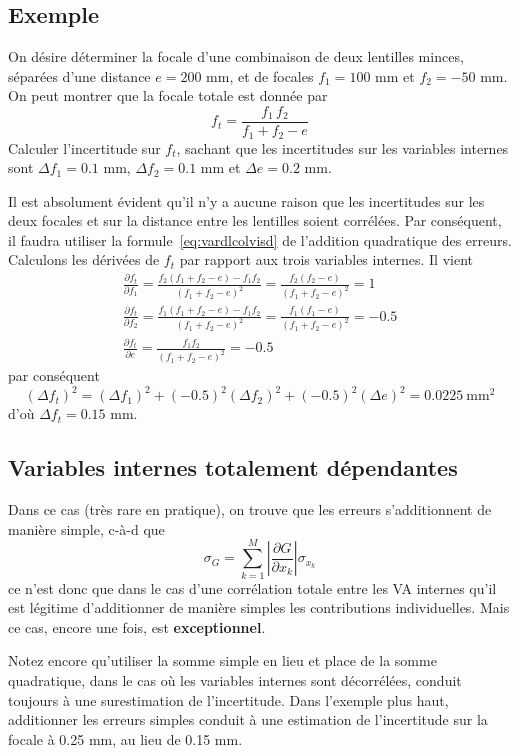 \subsection*{Exemple}\label{sec:exopt}

On désire déterminer la focale d'une combinaison de deux lentilles minces, séparées d'une distance $e=200$ mm, et de focales $f_1=100$ mm et $f_2=-50$ mm. On peut montrer que la focale totale est donnée par
$$
f_t=\frac{f_1\,f_2}{f_1+f_2-e}
$$
Calculer l'incertitude sur $f_t$, sachant que les incertitudes sur les variables internes sont $\Delta f_1=0.1$ mm, $\Delta f_2=0.1$ mm et $\Delta e=0.2$ mm.

Il est absolument évident qu'il n'y a aucune raison que les incertitudes sur les deux focales et sur la distance entre les lentilles soient corrélées. Par conséquent, il faudra utiliser la formule~\ref{eq:vardlcolvisd} de l'addition quadratique des erreurs. Calculons les dérivées de $f_t$ par rapport aux trois variables internes. Il vient
\begin{gather*}
\frac{\partial f_t}{\partial f_1}=\frac{f_2(f_1+f_2-e)-f_1f_2}{(f_1+f_2-e)^2}=
\frac{f_2(f_2-e)}{(f_1+f_2-e)^2}=1\\
\frac{\partial f_t}{\partial f_2}=\frac{f_1(f_1+f_2-e)-f_1f_2}{(f_1+f_2-e)^2}=
\frac{f_1(f_1-e)}{(f_1+f_2-e)^2}=-0.5\\
\frac{\partial f_t}{\partial e}=\frac{f_1f_2}{(f_1+f_2-e)^2}=-0.5
\end{gather*}
par conséquent
$$
(\Delta f_t)^2=(\Delta f_1)^2+(-0.5)^2(\Delta f_2)^2+(-0.5)^2(\Delta e)^2=0.0225\ \text{mm}^2
$$
d'où $\Delta f_t=0.15$ mm.

\subsection{Variables internes totalement dépendantes}

Dans ce cas (très rare en pratique), on trouve que les erreurs s'additionnent de manière simple, c-à-d que
\begin{equation}
\sigma_G=\sum\limits_{k=1}^{M}\left|\frac{\partial G}{\partial x_k}\right|\sigma_{x_k}
\end{equation}
ce n'est donc que dans le cas d'une corrélation totale entre les VA internes qu'il est légitime d'additionner de manière simples les contributions individuelles. Mais ce cas, encore une fois, est \textbf{exceptionnel}.

Notez encore qu'utiliser la somme simple en lieu et place de la somme quadratique, dans le cas où les variables internes sont décorrélées, conduit toujours à une surestimation de l'incertitude. Dans l'exemple plus haut, additionner les erreurs simples conduit à une estimation de l'incertitude sur la focale à 0.25 mm, au lieu de 0.15 mm.

